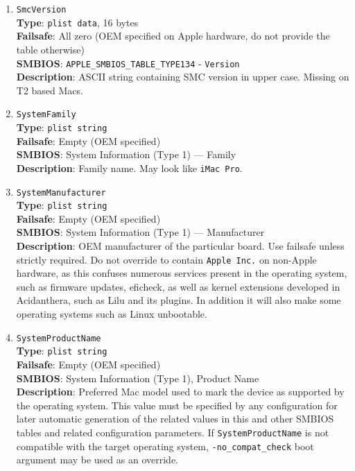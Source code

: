\documentclass[]{article}
\begin{document}
\begin{enumerate}
  Automatic value generation attempts to provide the most accurate value for
  the currently installed CPU. When this fails, please raise an
  \href{https://github.com/acidanthera/bugtracker/issues}{issue} and
  provide \texttt{sysctl machdep.cpu} and
  \href{https://github.com/acidanthera/dmidecode}{\texttt{dmidecode}} output.
  For a full list of available values and their limitations (the value will
  only apply if the CPU core count matches), refer to the Apple SMBIOS definitions header
  \href{https://github.com/acidanthera/MaxRegnerPkg/blob/master/Include/Apple/IndustryStandard/AppleSmBios.h}{here}.
\item
  \texttt{SmcVersion}\\
  \textbf{Type}: \texttt{plist\ data}, 16 bytes\\
  \textbf{Failsafe}: All zero (OEM specified on Apple hardware, do not provide the table otherwise)\\
  \textbf{SMBIOS}: \texttt{APPLE\_SMBIOS\_TABLE\_TYPE134} - \texttt{Version}\\
  \textbf{Description}: ASCII string containing SMC version in upper case.
  Missing on T2 based Macs.
\item
  \texttt{SystemFamily}\\
  \textbf{Type}: \texttt{plist\ string}\\
  \textbf{Failsafe}: Empty (OEM specified)\\
  \textbf{SMBIOS}: System Information (Type 1) --- Family\\
  \textbf{Description}: Family name. May look like \texttt{iMac\ Pro}.
\item
  \texttt{SystemManufacturer}\\
  \textbf{Type}: \texttt{plist\ string}\\
  \textbf{Failsafe}: Empty (OEM specified)\\
  \textbf{SMBIOS}: System Information (Type 1) --- Manufacturer\\
  \textbf{Description}: OEM manufacturer of the particular board. Use failsafe
  unless strictly required. Do not override to contain \texttt{Apple\ Inc.}
  on non-Apple hardware, as this confuses numerous services present in
  the operating system, such as firmware updates, eficheck, as well as
  kernel extensions developed in Acidanthera, such as Lilu and its
  plugins. In addition it will also make some operating systems
  such as Linux unbootable.
\item
  \texttt{SystemProductName}\\
  \textbf{Type}: \texttt{plist\ string}\\
  \textbf{Failsafe}: Empty (OEM specified)\\
  \textbf{SMBIOS}: System Information (Type 1), Product Name\\
  \textbf{Description}: Preferred Mac model used to mark the device as
  supported by the operating system. This value must be specified by any
  configuration for later automatic generation of the related values in
  this and other SMBIOS tables and related configuration parameters. If
  \texttt{SystemProductName} is not compatible with the target operating
  system, \texttt{-no\_compat\_check} boot argument may be used as an
  override.


\end{enumerate}
\end{document}
